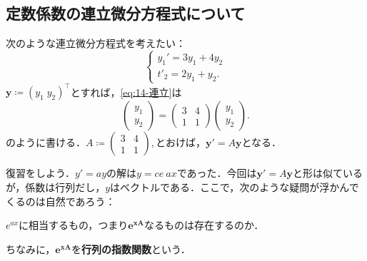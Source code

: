 \subsection{定数係数の連立微分方程式について}
次のような連立微分方程式を考えたい：
\begin{equation} \label{eq:14-連立}
    \begin{cases}
        y_1' = 3y_1 + 4y_2 \\
        t'_2 = 2y_1 + y_2.
    \end{cases}
\end{equation}
$\bm{y} \coloneqq (y_1 \; y_2)^\top$とすれば，\eqref{eq:14-連立}は
\[ 
\begin{pmatrix}
    y_1 \\ y_2
\end{pmatrix}
= 
\begin{pmatrix}
    3 & 4 \\ 1 & 1
\end{pmatrix}
\begin{pmatrix}
    y_1 \\ y_2
\end{pmatrix}.\]
のように書ける．$A \coloneqq
\begin{pmatrix}
    3 & 4 \\ 1 & 1
\end{pmatrix},$とおけば，$\bm{y}' = A\bm{y}$となる．

復習をしよう．$y'=ay$の解は$y=ce~{ax}$であった．今回は$\bm{y}' = A\bm{y}$と形は似ているが，係数は行列だし，$y$はベクトルである．ここで，次のような疑問が浮かんでくるのは自然であろう：
\begin{question*}
    $e^{ax}$に相当するもの，つまり$\bm{e^{xA}}$なるものは存在するのか．
\end{question*}
ちなみに，$\bm{e^{xA}}$を\textbf{行列の指数関数}という．

